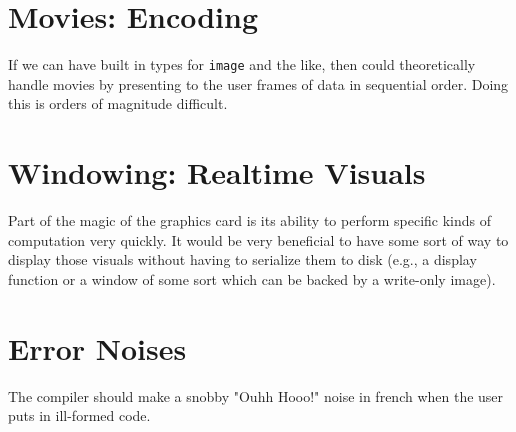 \section{Movies: Encoding}
If we can have built in types for \lstinline|image| and the like, then \lepix{} could theoretically handle movies by presenting to the user frames of data in sequential order. Doing this is orders of magnitude difficult.

\section{Windowing: Realtime Visuals}
Part of the magic of the graphics card is its ability to perform specific kinds of computation very quickly. It would be very beneficial to have some sort of way to display those visuals without having to serialize them to disk (e.g., a display function or a window of some sort which can be backed by a write-only image).

\section{Error Noises}
The compiler should make a snobby "Ouhh Hooo!" noise in french when the user puts in ill-formed code.
